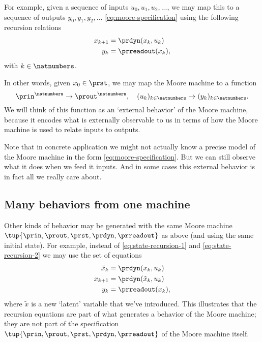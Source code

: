 For example, given a sequence of inputs $u_0, u_1, u_2, ... $, we may map this to a sequence of outputs $y_0, y_1, y_2, ... $ \cref{eq:moore-specification} using the following recursion relations
\begin{align}
x_{k+1} &= \prdyn(x_k, u_k) \label{eq:state-recursion-1} \\
y_{k} &= \prreadout(x_{k}), \label{eq:state-recursion-2}
\end{align}
with $k \in \natnumbers$. 

In other words, given $x_0 \in \prst$, we may map the Moore machine \label{eq:moore-again} to a function 
\begin{equation}
\prin^\natnumbers \to \prout^\natnumbers,  \quad (u_k)_{k \in \natnumbers} \mapsto (y_k)_{k \in \natnumbers}. 
\end{equation}
We will think of this function as an `external behavior' of the Moore machine, because it encodes what is externally observable to us in terms of how the Moore machine is used to relate inputs to outputs. 


Note that in concrete application we might not actually know a precise model of the Moore machine in the form \cref{eq:moore-specification}. But we can still observe what it does when we feed it inputs. And in some cases this external behavior is in fact all we really care about. 

\subsection{Many behaviors from one machine}

Other kinds of behavior may be generated with the same Moore machine $\tup{\prin, \prout, \prst, \prdyn, \prreadout}$ as above (and using the same initial state). For example, instead of \cref{eq:state-recursion-1} and \cref{eq:state-recursion-2} we may use the set of equations
\begin{align}
\tilde x_{k} &= \prdyn(x_k, u_k) \\
x_{k+1} &= \prdyn(\tilde x_{k}, u_k) \\
y_{k} &= \prreadout(x_{k}),
\end{align}
where $\tilde x$ is a new `latent' variable that we've introduced. This illustrates that the recursion equations are part of what generates a behavior of the Moore machine; they are not part of the specification $\tup{\prin, \prout, \prst, \prdyn, \prreadout}$ of the Moore machine itself. 




